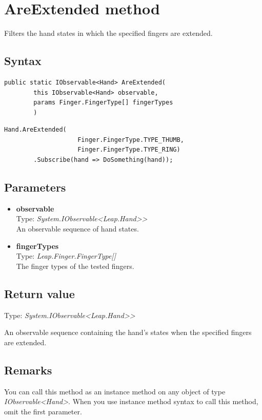 \documentclass[12pt,a4paper,twoside]{report}
\begin{document}
\section{AreExtended method}
Filters the hand states in which the specified fingers are extended.

\subsection{Syntax}
\begin{lstlisting}[caption=Declaration]
     public static IObservable<Hand> AreExtended(
        this IObservable<Hand> observable,
        params Finger.FingerType[] fingerTypes
        )
\end{lstlisting}

\begin{lstlisting}[caption=Usage example]
    Hand.AreExtended(
                    Finger.FingerType.TYPE_THUMB,
                    Finger.FingerType.TYPE_RING)
        .Subscribe(hand => DoSomething(hand));
\end{lstlisting}

\subsection{Parameters}
\begin{itemize}
    \item \textbf{observable}\\
    Type: \textit{System.IObservable<Leap.Hand>{}>}\\
    An observable sequence of hand states.
    
    \item \textbf{fingerTypes}\\
    Type: \textit{Leap.Finger.FingerType[]}\\
    The finger types of the tested fingers.
\end{itemize}

\subsection{Return value}
Type: \textit{System.IObservable<Leap.Hand>{}>}

An observable sequence containing the hand's states when the specified fingers are extended.

\subsection{Remarks}
You can call this method as an instance method on any object of type \textit{IObservable<Hand>}. When you use 
instance method syntax to call this method, omit the first parameter.
\end{document}
